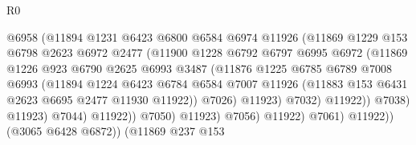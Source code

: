 \begin{lexlean}{R0}
\begin{coremodule}
                                  @6958
                                  (@11894
                                    @1231
                                    @6423
                                    @6800
                                    @6584
                                    @6974
                                    @11926
                                    (@11869
                                      @1229
                                      @153
                                      @6798
                                      @2623
                                      @6972
                                      @2477
                                      (@11900
                                        @1228
                                        @6792
                                        @6797
                                        @6995
                                        @6972
                                        (@11869
                                          @1226
                                          @923
                                          @6790
                                          @2625
                                          @6993
                                          @3487
                                          (@11876
                                            @1225
                                            @6785
                                            @6789
                                            @7008
                                            @6993
                                            (@11894
                                              @1224
                                              @6423
                                              @6784
                                              @6584
                                              @7007
                                              @11926
                                              (@11883 @153 @6431 @2623 @6695 @2477 @11930 @11922))
                                            @7026)
                                          @11923)
                                        @7032)
                                      @11922))
                                  @7038)
                                @11923)
                              @7044)
                            @11922))
                        @7050)
                      @11923)
                    @7056)
                  @11922)
                @7061)
              @11922))
          (@3065 @6428 @6872))
        (@11869
          @237
          @153

\end{coremodule}
\end{lexlean}
